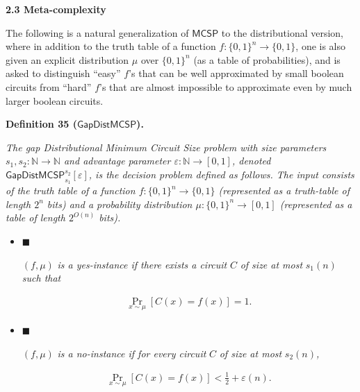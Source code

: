 \documentclass[10pt,a4paper]{article}
\begin{document}





\par\medskip\noindent\textbf{
2.3 Meta-complexity}\par




The following is a natural generalization of ${\mathsf{MCSP}}$ to the distributional version, where in addition to the truth table of a function $f:\{0,1\}^{n}\to\{0,1\}$, one is also given an explicit distribution $\mu$ over $\{0,1\}^{n}$ (as a table of probabilities), and is asked to distinguish “easy” $f$’s that can be well approximated by small boolean circuits from “hard” $f$’s that are almost impossible to approximate even by much larger boolean circuits.\par





\par\medskip\noindent\textbf{
\textbf{Definition 35}\textbf{ }(${\mathsf{GapDistMCSP}}$)\textbf{.}
}\par



\emph{The gap Distributional Minimum Circuit Size problem with size parameters $s_{1},s_{2}:\mathbb{N}\to\mathbb{N}$ and advantage parameter $\varepsilon:\mathbb{N}\to[0,1]$, denoted ${\mathsf{GapDistMCSP}}_{s_{1}}^{s_{2}}[\varepsilon]$, is the decision problem defined as follows. The input consists of the truth table of a function $f:\{0,1\}^{n}\to\{0,1\}$ (represented as a truth-table of length $2^{n}$ bits) and a probability distribution $\mu:\{0,1\}^{n}\to[0,1]$ (represented as a table of length $2^{O(n)}$ bits).}\par


\begin{itemize}


\item[] 
$\blacksquare$ 


$(f,\mu)$\emph{ is a yes-instance if there exists a circuit }$C$\emph{ of size at most }$s_{1}(n)$\emph{ such that}\par


\[\begin{gathered}
\Pr_{x\sim\mu}\left[C(x)=f(x)\right]=1.
\end{gathered}\]





\item[] 
$\blacksquare$ 


$(f,\mu)$\emph{ is a no-instance if for every circuit }$C$\emph{ of size at most }$s_{2}(n)$\emph{,}\par


\[\begin{gathered}
\Pr_{x\sim\mu}\left[C(x)=f(x)\right]<\frac{1}{2}+\varepsilon(n).
\end{gathered}\]





\end{itemize}
\end{document}
